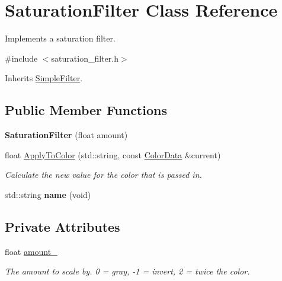 \hypertarget{classSaturationFilter}{}\section{Saturation\+Filter Class Reference}
\label{classSaturationFilter}


Implements a saturation filter.  




{\ttfamily \#include $<$saturation\+\_\+filter.\+h$>$}



Inherits \hyperlink{classSimpleFilter}{Simple\+Filter}.

\subsection*{Public Member Functions}
\begin{DoxyCompactItemize}
\item 
{\bfseries Saturation\+Filter} (float amount)\hypertarget{classSaturationFilter_aec12acab65dcbb9b423f649f6fc106e3}{}\label{classSaturationFilter_aec12acab65dcbb9b423f649f6fc106e3}

\item 
float \hyperlink{classSaturationFilter_a1c56517df4bbdcd1b8e61bf1254f71b6}{Apply\+To\+Color} (std\+::string, const \hyperlink{classimage__tools_1_1ColorData}{Color\+Data} \&current)
\begin{DoxyCompactList}\small\item\em Calculate the new value for the color that is passed in. \end{DoxyCompactList}\item 
std\+::string {\bfseries name} (void)\hypertarget{classSaturationFilter_af3e40405d633fca9979f5612a85f791d}{}\label{classSaturationFilter_af3e40405d633fca9979f5612a85f791d}

\end{DoxyCompactItemize}
\subsection*{Private Attributes}
\begin{DoxyCompactItemize}
\item 
float \hyperlink{classSaturationFilter_a48242a44a85710a303cb57e90b9fb1f5}{amount\+\_\+}\hypertarget{classSaturationFilter_a48242a44a85710a303cb57e90b9fb1f5}{}\label{classSaturationFilter_a48242a44a85710a303cb57e90b9fb1f5}

\begin{DoxyCompactList}\small\item\em The amount to scale by. 0 = gray, -\/1 = invert, 2 = twice the color. \end{DoxyCompactList}\end{DoxyCompactItemize}


